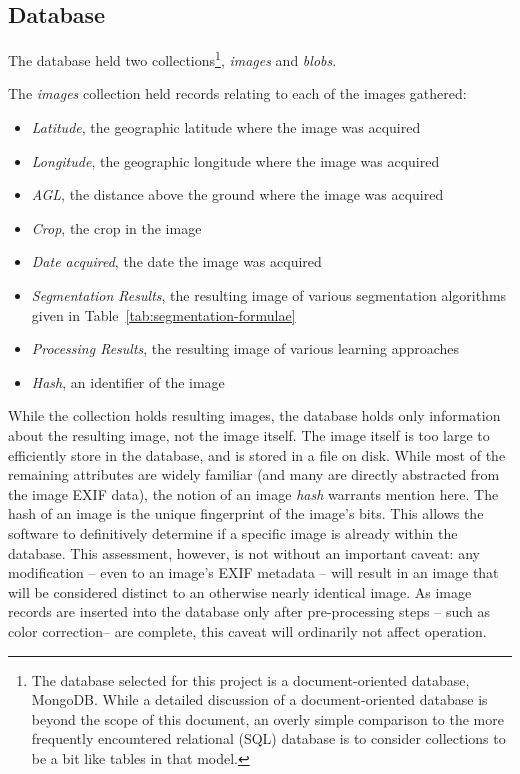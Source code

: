 \documentclass[letterpaper]{article}
\begin{document}
{\subsection{Database}
The database held two collections\footnote{The database selected for this project is a document-oriented database, MongoDB. While a detailed discussion of a document-oriented database is beyond the scope of this document, an overly simple comparison to the more frequently encountered relational (SQL) database is to consider collections to be a bit like tables in that model.}, \textit{images} and \textit{blobs}.

The \textit{images} collection held records relating to each of the images gathered:
\begin{itemize}
	\item{\textit{Latitude}, the geographic latitude where the image was acquired}
	\item{\textit{Longitude}, the geographic longitude where the image was acquired}
	\item{\textit{AGL}, the distance above the ground where the image was acquired}
	\item{\textit{Crop}, the crop in the image}
	\item{\textit{Date acquired}, the date the image was acquired}
	\item{\textit{Segmentation Results}, the resulting image of various segmentation algorithms given in Table~\ref{tab:segmentation-formulae}}	
	\item{\textit{Processing Results}, the resulting image of various learning approaches}	
	\item{\textit{Hash}, an identifier of the image}	
\end{itemize}
 While the collection holds resulting images, the database holds only information about the resulting image, not the image itself. The image itself is too large to efficiently store in the database, and is stored in a file on disk. While most of the remaining attributes are widely familiar (and many are directly abstracted from the image EXIF data), the notion of an image \textit{hash} warrants mention here. The hash of an image is the unique fingerprint of the image's bits. This allows the software to definitively determine if a specific image is already within the database. This assessment, however, is not without an important caveat: any modification -- even to an image's EXIF metadata -- will result in an image that will be considered distinct to an otherwise nearly identical image. As image records are inserted into the database only after pre-processing steps -- such as color correction-- are complete, this caveat will ordinarily not affect operation.
 
}
\end{document}
